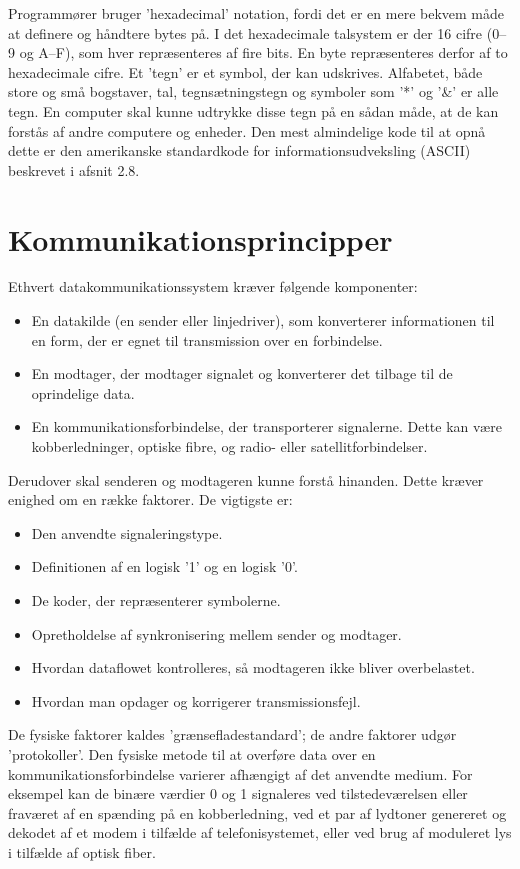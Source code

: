 Programmører bruger 'hexadecimal' notation, fordi det er en mere bekvem måde at definere og håndtere bytes på. I det hexadecimale talsystem er der 16 cifre (0–9 og A–F), som hver repræsenteres af fire bits. En byte repræsenteres derfor af to hexadecimale cifre.
\newline\newline\noindent 
Et 'tegn' er et symbol, der kan udskrives. Alfabetet, både store og små bogstaver, tal, tegnsætningstegn og symboler som '*' og '\&' er alle tegn. En computer skal kunne udtrykke disse tegn på en sådan måde, at de kan forstås af andre computere og enheder. Den mest almindelige kode til at opnå dette er den amerikanske standardkode for informationsudveksling (ASCII) beskrevet i afsnit 2.8.

\section{Kommunikationsprincipper}
Ethvert datakommunikationssystem kræver følgende komponenter:
\begin{itemize}
	\item En datakilde (en sender eller linjedriver), som konverterer informationen til en form, der er egnet til transmission over en forbindelse.
	\item En modtager, der modtager signalet og konverterer det tilbage til de oprindelige data.
	\item En kommunikationsforbindelse, der transporterer signalerne. Dette kan være kobberledninger, optiske fibre, og radio- eller satellitforbindelser.
\end{itemize}
Derudover skal senderen og modtageren kunne forstå hinanden. Dette kræver enighed om en række faktorer. De vigtigste er:
\begin{itemize}
	\item Den anvendte signaleringstype.
	\item Definitionen af en logisk '1' og en logisk '0'.
	\item De koder, der repræsenterer symbolerne.
	\item Opretholdelse af synkronisering mellem sender og modtager.
	\item Hvordan dataflowet kontrolleres, så modtageren ikke bliver overbelastet.
	\item Hvordan man opdager og korrigerer transmissionsfejl.
\end{itemize}
De fysiske faktorer kaldes 'grænsefladestandard'; de andre faktorer udgør 'protokoller'.
\newline\newline\noindent 
Den fysiske metode til at overføre data over en kommunikationsforbindelse varierer afhængigt af det anvendte medium. For eksempel kan de binære værdier 0 og 1 signaleres ved tilstedeværelsen eller fraværet af en spænding på en kobberledning, ved et par af lydtoner genereret og dekodet af et modem i tilfælde af telefonisystemet, eller ved brug af moduleret lys i tilfælde af optisk fiber.

